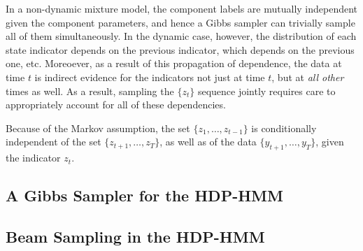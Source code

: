 In a non-dynamic mixture model, the component labels are mutually
independent given the component parameters, and hence a Gibbs sampler
can trivially sample all of them simultaneously.  In the dynamic case,
however, the distribution of each state indicator depends on the
previous indicator, which depends on the previous one, etc.
Moreoever, as a result of this propagation of dependence, the data at
time $t$ is indirect evidence for the indicators not just at time $t$,
but at {\em all other} times as well.  As a result,
sampling the $\{z_t\}$ sequence jointly requires care to appropriately
account for all of these dependencies.

Because of the Markov assumption, the set $\{z_1, \dots,
z_{t-1}\}$ is conditionally independent of the set $\{z_{t+1}, \dots,
z_{T}\}$, as well as of the data $\{y_{t+1}, \dots, y_{T}\}$, given
the indicator $z_t$.

\subsection{A Gibbs Sampler for the HDP-HMM}

\subsection{Beam Sampling in the HDP-HMM}
